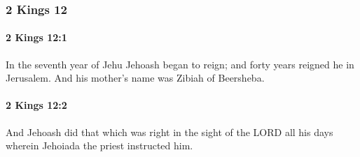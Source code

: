 	\subsubsection{2 Kings 12} %
		\label{2KINGS-12}

		\paragraph{2 Kings 12:1} %
			\label{2KINGS-12-1}

			In the seventh year of Jehu Jehoash began to reign; and forty years reigned he in Jerusalem. And his mother’s name was Zibiah of Beersheba.


		\paragraph{2 Kings 12:2} %
			\label{2KINGS-12-2}

			And Jehoash did that which was right in the sight of the LORD all his days wherein Jehoiada the priest instructed him.

